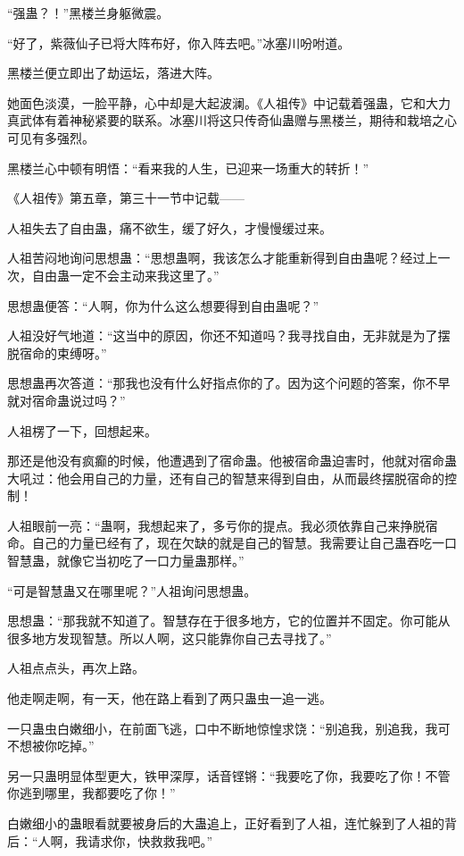 \begin{this_body}
“强蛊？！”黑楼兰身躯微震。

“好了，紫薇仙子已将大阵布好，你入阵去吧。”冰塞川吩咐道。

黑楼兰便立即出了劫运坛，落进大阵。

她面色淡漠，一脸平静，心中却是大起波澜。《人祖传》中记载着强蛊，它和大力真武体有着神秘紧要的联系。冰塞川将这只传奇仙蛊赠与黑楼兰，期待和栽培之心可见有多强烈。

黑楼兰心中顿有明悟：“看来我的人生，已迎来一场重大的转折！”

《人祖传》第五章，第三十一节中记载——

人祖失去了自由蛊，痛不欲生，缓了好久，才慢慢缓过来。

人祖苦闷地询问思想蛊：“思想蛊啊，我该怎么才能重新得到自由蛊呢？经过上一次，自由蛊一定不会主动来我这里了。”

思想蛊便答：“人啊，你为什么这么想要得到自由蛊呢？”

人祖没好气地道：“这当中的原因，你还不知道吗？我寻找自由，无非就是为了摆脱宿命的束缚呀。”

思想蛊再次答道：“那我也没有什么好指点你的了。因为这个问题的答案，你不早就对宿命蛊说过吗？”

人祖楞了一下，回想起来。

那还是他没有疯癫的时候，他遭遇到了宿命蛊。他被宿命蛊迫害时，他就对宿命蛊大吼过：他会用自己的力量，还有自己的智慧来得到自由，从而最终摆脱宿命的控制！

人祖眼前一亮：“蛊啊，我想起来了，多亏你的提点。我必须依靠自己来挣脱宿命。自己的力量已经有了，现在欠缺的就是自己的智慧。我需要让自己蛊吞吃一口智慧蛊，就像它当初吃了一口力量蛊那样。”

“可是智慧蛊又在哪里呢？”人祖询问思想蛊。

思想蛊：“那我就不知道了。智慧存在于很多地方，它的位置并不固定。你可能从很多地方发现智慧。所以人啊，这只能靠你自己去寻找了。”

人祖点点头，再次上路。

他走啊走啊，有一天，他在路上看到了两只蛊虫一追一逃。

一只蛊虫白嫩细小，在前面飞逃，口中不断地惊惶求饶：“别追我，别追我，我可不想被你吃掉。”

另一只蛊明显体型更大，铁甲深厚，话音铿锵：“我要吃了你，我要吃了你！不管你逃到哪里，我都要吃了你！”

白嫩细小的蛊眼看就要被身后的大蛊追上，正好看到了人祖，连忙躲到了人祖的背后：“人啊，我请求你，快救救我吧。”


\end{this_body}
